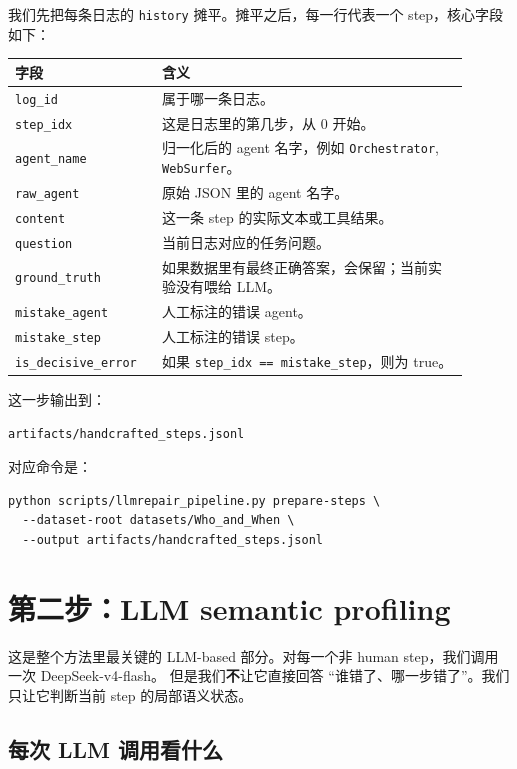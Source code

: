 \documentclass[UTF8,a4paper,11pt]{ctexart}
\begin{document}
我们先把每条日志的 \texttt{history} 摊平。摊平之后，每一行代表一个 step，核心字段如下：

\begin{longtable}{p{0.28\linewidth}p{0.62\linewidth}}
\toprule
字段 & 含义 \\
\midrule
\endhead
\texttt{log\_id} & 属于哪一条日志。 \\
\texttt{step\_idx} & 这是日志里的第几步，从 0 开始。 \\
\texttt{agent\_name} & 归一化后的 agent 名字，例如 \texttt{Orchestrator}, \texttt{WebSurfer}。 \\
\texttt{raw\_agent} & 原始 JSON 里的 agent 名字。 \\
\texttt{content} & 这一条 step 的实际文本或工具结果。 \\
\texttt{question} & 当前日志对应的任务问题。 \\
\texttt{ground\_truth} & 如果数据里有最终正确答案，会保留；当前实验没有喂给 LLM。 \\
\texttt{mistake\_agent} & 人工标注的错误 agent。 \\
\texttt{mistake\_step} & 人工标注的错误 step。 \\
\texttt{is\_decisive\_error} & 如果 \texttt{step\_idx == mistake\_step}，则为 true。 \\
\bottomrule
\end{longtable}

这一步输出到：

\begin{verbatim}
artifacts/handcrafted_steps.jsonl
\end{verbatim}

对应命令是：

\begin{verbatim}
python scripts/llmrepair_pipeline.py prepare-steps \
  --dataset-root datasets/Who_and_When \
  --output artifacts/handcrafted_steps.jsonl
\end{verbatim}

\section{第二步：LLM semantic profiling}

这是整个方法里最关键的 LLM-based 部分。对每一个非 human step，我们调用一次 DeepSeek-v4-flash。
但是我们\textbf{不}让它直接回答 ``谁错了、哪一步错了''。我们只让它判断当前 step 的局部语义状态。

\subsection{每次 LLM 调用看什么}
\end{document}
